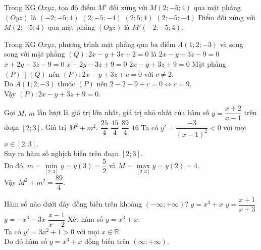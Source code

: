 \begin{ex}%
	Trong KG $Oxyz$, tọa độ điểm $M'$ đối xứng với $M(2;-5;4)$ qua mặt phẳng $(Oyz)$ là
	\choice
	{\True $(-2;-5;4)$}
	{$(2;-5;-4)$}
	{$(2;5;4)$}
	{$(2;-5;-4)$}
	\loigiai
	{
Điểm đối xứng với $M(2;-5;4)$ qua mặt phẳng $(Oyz)$ là $M'(-2;-5;4)$.
	}
\end{ex}
\begin{ex}%
Trong KG $Oxyz$, phương trình mặt phẳng qua ba điểm $A(1;2;-3)$ và song song với mặt phẳng $(Q)\colon 2x-y+3z+2=0$ là
	\choice
	{$2x-y+3z-9=0$}
	{$x+2y-3z-9=0$}
	{$x-2y-3z+9=0$}
	{\True $2x-y+3z+9=0$}
	\loigiai
	{
		Mặt phẳng $(P)\parallel (Q)$ nên $(P)\colon 2x-y+3z+c=0$ với $c\ne 2$.\\
		Do $A(1;2;-3)$ thuộc $(P)$ nên $2-2-9+c=0\Leftrightarrow c=9$.\\
		Vậy $(P)\colon 2x-y+3z+9=0$.
	}
\end{ex}
\begin{ex}%
	Gọi $M$, $m$ lần lượt là giá trị lớn nhất, giá trị nhỏ nhất của hàm số $y=\dfrac{x+2}{x-1}$ trên đoạn $[2;3]$. Giá trị $M^2+m^2$.
	\choice
	{$\dfrac{25}{4}$}
	{$\dfrac{45}{4}$}
	{\True $\dfrac{89}{4}$}
	{$16$}
	\loigiai
	{
	Ta có $y'=\dfrac{-3}{(x-1)^2}<0$ với mọi $x\in [2;3]$.\\
	Suy ra hàm số nghịch biến trên đoạn $[2;3]$.\\
	Do đó, $m=\min\limits_{[2;3]}y=y(3)=\dfrac{5}{2}$ và $M=\max\limits_{[2;3]}y=y(2)=4$.\\
	Vậy $M^2+m^2=\dfrac{89}{4}$.
	}
\end{ex}
\begin{ex}%
Hàm số nào dưới đây đồng biến trên khoảng $(-\infty;+\infty)$?
	\choice
	{\True $y=x^3+x$}
	{$y=\dfrac{x+1}{x+3}$}
	{$y=-x^3-3x$}
	{$\dfrac{x-1}{x-2}$}
	\loigiai
	{
	Xét hàm số $y=x^3+x$.\\
	Ta có $y'=3x^2+1>0$ với mọi $x\in \mathbb{R}$.\\
	Do đó hàm số $y=x^3+x$ đồng biến trên $(\infty;+\infty)$.
	}
\end{ex}
